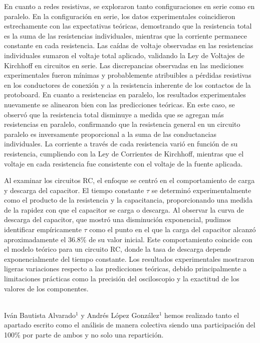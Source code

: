 \documentclass[article,12pt]{elsarticle}
\begin{document}
En cuanto a redes resistivas, se exploraron tanto configuraciones en serie como en paralelo. En la configuración en serie, los datos experimentales coincidieron estrechamente con las expectativas teóricas, demostrando que la resistencia total es la suma de las resistencias individuales, mientras que la corriente permanece constante en cada resistencia. Las caídas de voltaje observadas en las resistencias individuales sumaron el voltaje total aplicado, validando la Ley de Voltajes de Kirchhoff en circuitos en serie. Las discrepancias observadas en las mediciones experimentales fueron mínimas y probablemente atribuibles a pérdidas resistivas en los conductores de conexión y a la resistencia inherente de los contactos de la protoboard. En cuanto a resistencias en paralelo, los resultados experimentales nuevamente se alinearon bien con las predicciones teóricas. En este caso, se observó que la resistencia total disminuye a medida que se agregan más resistencias en paralelo, confirmando que la resistencia general en un circuito paralelo es inversamente proporcional a la suma de las conductancias individuales. La corriente a través de cada resistencia varió en función de su resistencia, cumpliendo con la Ley de Corrientes de Kirchhoff, mientras que el voltaje en cada resistencia fue consistente con el voltaje de la fuente aplicada.

Al examinar los circuitos RC, el enfoque se centró en el comportamiento de carga y descarga del capacitor. El tiempo constante \(\tau\) se determinó experimentalmente como el producto de la resistencia y la capacitancia, proporcionando una medida de la rapidez con que el capacitor se carga o descarga. Al observar la curva de descarga del capacitor, que mostró una disminución exponencial, pudimos identificar empíricamente \(\tau\) como el punto en el que la carga del capacitor alcanzó aproximadamente el 36.8\% de su valor inicial. Este comportamiento coincide con el modelo teórico para un circuito RC, donde la tasa de descarga depende exponencialmente del tiempo constante. Los resultados experimentales mostraron ligeras variaciones respecto a las predicciones teóricas, debido principalmente a limitaciones prácticas como la precisión del osciloscopio y la exactitud de los valores de los componentes.

\newpage
{}\\ 

Iván Bautista Alvarado$^1$ y Andrés López González$^1$ hemos realizado tanto el apartado escrito como el análisis de manera colectiva siendo una participación del 100\% por parte de ambos y no solo una repartición.\\ 
\end{document}
